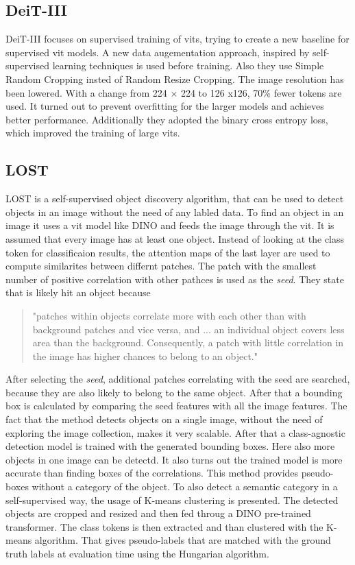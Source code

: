 \documentclass[conference]{IEEEtran}
\begin{document}
  \subsection{\mbox{DeiT-III}}
  \label{sec:deit3}

  \mbox{DeiT-III} focuses on supervised training of \acp{vit}, trying to create a new baseline for supervised \ac{vit} models. A new data augementation approach, inspired by self-supervised learning techniques is used before training. Also they use Simple Random Cropping insted of Random Resize Cropping. The image resolution has been lowered. With a change from 224 × 224 to 126 x126, 70\% fewer tokens are used. It turned out to prevent overfitting for the larger models and achieves better performance. Additionally they adopted the binary cross entropy loss, which improved the training of large \acp{vit}. \cite{deit3}

  \subsection{LOST}
  \label{chapter:lost}

  \mbox{LOST} is a self-supervised object discovery algorithm, that can be used to detect objects in an image without the need of any labled data. To find an object in an image it uses a \ac{vit} model like \mbox{DINO} and feeds the image through the \ac{vit}. It is assumed that every image has at least one object. Instead of looking at the class token for classificaion results, the attention maps of the last layer are used to compute similarites between differnt patches. The patch with the smallest number of positive correlation with other pathces is used as the \textit{seed}. They state that is likely hit an object because
  \begin{quote}
    "patches within objects correlate more with each other than with background patches and vice versa, and ... an individual object covers less area than the background. Consequently, a patch with little correlation in the image has higher chances to belong to an object." \cite{lost}
  \end{quote}
  After selecting the \textit{seed}, additional patches correlating with the seed are searched, because they are also likely to belong to the same object. After that a bounding box is calculated by comparing the seed features with all the image features. The fact that the method detects objects on a single image, without the need of exploring the image collection, makes it very scalable. After that a class-agnostic detection model is trained with the generated bounding boxes. Here also more objects in one image can be detectd. It also turns out the trained model is more accurate than finding boxes of the correlations. This method provides pseudo-boxes without a category of the object. To also detect a semantic category in a self-supervised way, the usage of K-means clustering is presented. The detected objects are cropped and resized and then fed throug a \mbox{DINO} pre-trained transformer. The class tokens is then extracted and than clustered with the K-means algorithm. That gives pseudo-labels that are matched with the ground truth labels at evaluation time using the Hungarian algorithm. \cite{lost}
\end{document}
